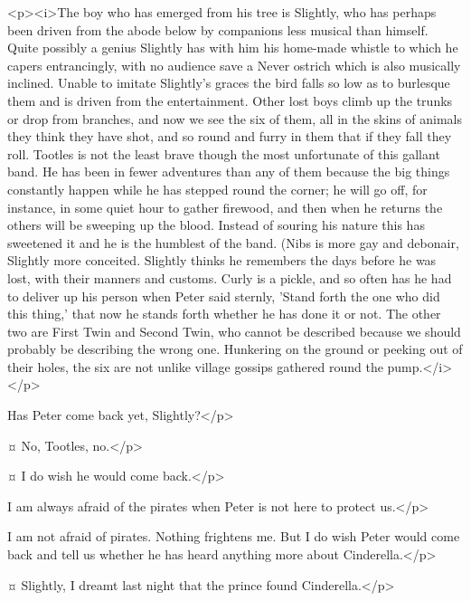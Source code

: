 <p><i>The boy who has emerged from his tree is Slightly, who has perhaps been driven from the abode below by companions less musical than himself.
Quite possibly a genius Slightly has with him his home-made whistle to which he capers entrancingly, with no audience save a Never ostrich which is also musically inclined.
Unable to imitate Slightly's graces the bird falls so low as to burlesque them and is driven from the entertainment.
Other lost boys climb up the trunks or drop from branches, and now we see the six of them, all in the skins of animals they think they have shot, and so round and furry in them that if they fall they roll.
Tootles is not the least brave though the most unfortunate of this gallant band.
He has been in fewer adventures than any of them because the big things constantly happen while he has stepped round the corner; he will go off, for instance, in some quiet hour to gather firewood, and then when he returns the others will be sweeping up the blood.
Instead of souring his nature this has sweetened it and he is the humblest of the band.
(Nibs is more gay and debonair, Slightly more conceited.
Slightly thinks he remembers the days before he was lost, with their manners and customs. Curly is a pickle, and so often has he had to deliver up his person when Peter said sternly, 'Stand forth the one who did this thing,' that now he stands forth whether he has done it or not.
The other two are First Twin and Second Twin, who cannot be described because we should probably be describing the wrong one.
Hunkering on the ground or peeking out of their holes, the six are not unlike village gossips gathered round the pump.</i></p>

\tootlesspeaks
Has Peter come back yet, Slightly?</p>

\slightlyspeaks {}¤
No, Tootles, no.</p>


\curlyspeaks {}¤
I do wish he would come back.</p>

\tootlesspeaks
I am always afraid of the pirates when Peter is not here to protect us.</p>

\slightlyspeaks
I am not afraid of pirates.
Nothing frightens me.
But I do wish Peter would come back and tell us whether he has heard anything more about Cinderella.</p>

\secondtwinspeaks {}¤
Slightly, I dreamt last night that the prince found Cinderella.</p>

